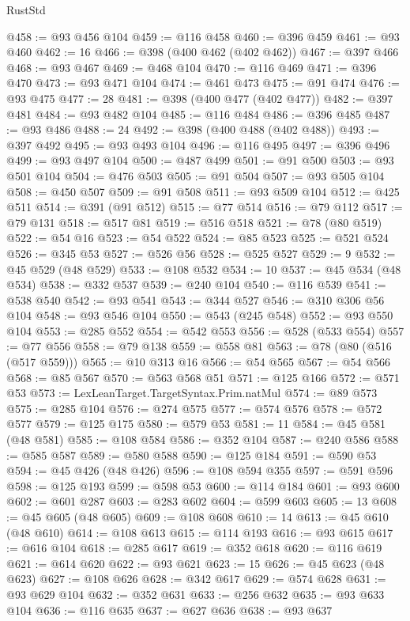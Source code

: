 \begin{lexlean}{RustStd}
\begin{coremodule}
@458 := @93 @456 @104
@459 := @116 @458
@460 := @396 @459
@461 := @93 @460
@462 := 16
@466 := @398 (@400 @462 (@402 @462))
@467 := @397 @466
@468 := @93 @467
@469 := @468 @104
@470 := @116 @469
@471 := @396 @470
@473 := @93 @471 @104
@474 := @461 @473
@475 := @91 @474
@476 := @93 @475
@477 := 28
@481 := @398 (@400 @477 (@402 @477))
@482 := @397 @481
@484 := @93 @482 @104
@485 := @116 @484
@486 := @396 @485
@487 := @93 @486
@488 := 24
@492 := @398 (@400 @488 (@402 @488))
@493 := @397 @492
@495 := @93 @493 @104
@496 := @116 @495
@497 := @396 @496
@499 := @93 @497 @104
@500 := @487 @499
@501 := @91 @500
@503 := @93 @501 @104
@504 := @476 @503
@505 := @91 @504
@507 := @93 @505 @104
@508 := @450 @507
@509 := @91 @508
@511 := @93 @509 @104
@512 := @425 @511
@514 := @391 (@91 @512)
@515 := @77 @514
@516 := @79 @112
@517 := @79 @131
@518 := @517 @81
@519 := @516 @518
@521 := @78 (@80 @519)
@522 := @54 @16
@523 := @54 @522
@524 := @85 @523
@525 := @521 @524
@526 := @345 @53
@527 := @526 @56
@528 := @525 @527
@529 := 9
@532 := @45 @529 (@48 @529)
@533 := @108 @532
@534 := 10
@537 := @45 @534 (@48 @534)
@538 := @332 @537
@539 := @240 @104
@540 := @116 @539
@541 := @538 @540
@542 := @93 @541
@543 := @344 @527
@546 := @310 @306 @56 @104
@548 := @93 @546 @104
@550 := @543 (@245 @548)
@552 := @93 @550 @104
@553 := @285 @552
@554 := @542 @553
@556 := @528 (@533 @554)
@557 := @77 @556
@558 := @79 @138
@559 := @558 @81
@563 := @78 (@80 (@516 (@517 @559)))
@565 := @10 @313 @16
@566 := @54 @565
@567 := @54 @566
@568 := @85 @567
@570 := @563 @568 @51
@571 := @125 @166
@572 := @571 @53
@573 := LexLeanTarget.TargetSyntax.Prim.natMul
@574 := @89 @573
@575 := @285 @104
@576 := @274 @575
@577 := @574 @576
@578 := @572 @577
@579 := @125 @175
@580 := @579 @53
@581 := 11
@584 := @45 @581 (@48 @581)
@585 := @108 @584
@586 := @352 @104
@587 := @240 @586
@588 := @585 @587
@589 := @580 @588
@590 := @125 @184
@591 := @590 @53
@594 := @45 @426 (@48 @426)
@596 := @108 @594 @355
@597 := @591 @596
@598 := @125 @193
@599 := @598 @53
@600 := @114 @184
@601 := @93 @600
@602 := @601 @287
@603 := @283 @602
@604 := @599 @603
@605 := 13
@608 := @45 @605 (@48 @605)
@609 := @108 @608
@610 := 14
@613 := @45 @610 (@48 @610)
@614 := @108 @613
@615 := @114 @193
@616 := @93 @615
@617 := @616 @104
@618 := @285 @617
@619 := @352 @618
@620 := @116 @619
@621 := @614 @620
@622 := @93 @621
@623 := 15
@626 := @45 @623 (@48 @623)
@627 := @108 @626
@628 := @342 @617
@629 := @574 @628
@631 := @93 @629 @104
@632 := @352 @631
@633 := @256 @632
@635 := @93 @633 @104
@636 := @116 @635
@637 := @627 @636
@638 := @93 @637

\end{coremodule}
\end{lexlean}
